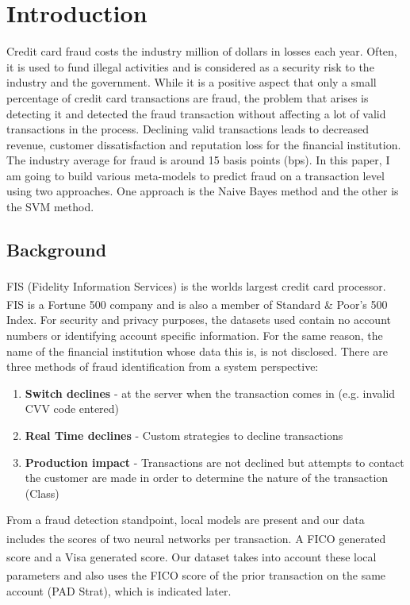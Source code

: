 \documentclass[conference]{IEEEtran}
\begin{document}
\section{Introduction}
Credit card fraud costs the industry million of dollars in losses each year. Often, it is used to fund illegal activities and is considered as a security risk to the industry and the government. While it is a positive aspect that only a small percentage of credit card transactions are fraud, the problem that arises is detecting it and detected the fraud transaction without affecting a lot of valid transactions in the process. Declining valid transactions leads to decreased revenue, customer dissatisfaction and reputation loss for the financial institution. The industry average for fraud is around 15 basis points (bps). In this paper, I am going to build various meta-models to predict fraud on a transaction level using two approaches. One approach is the Naive Bayes method and the other is the SVM method. 

\subsection{Background}

FIS\textsuperscript{\textregistered} (Fidelity Information Services) is the worlds largest credit card processor. FIS\textsuperscript{\textregistered} is a Fortune 500 company and is also a member of Standard \& Poor’s 500\textsuperscript{\textregistered} Index. For security and privacy purposes, the datasets used contain no account numbers or identifying account specific information. For the same reason, the name of the financial institution whose data this is, is not disclosed. There are three methods of fraud identification from a system perspective:

\begin{enumerate}
\item \textbf{Switch declines} - at the server when the transaction comes in (e.g. invalid CVV code entered)
\item \textbf{Real Time declines} - Custom strategies to decline transactions
\item \textbf{Production impact} - Transactions are not declined but attempts to contact the customer are made in order to determine the nature of the transaction (Class)
\end{enumerate}


From a fraud detection standpoint, local models are present and our data includes the scores of two neural networks per transaction. A FICO\textsuperscript{\textregistered} generated score and a Visa\textsuperscript{\textregistered} generated score. Our dataset takes into account these local parameters and also uses the FICO\textsuperscript{\textregistered} score of the prior transaction on the same account (PAD Strat), which is indicated later.
\end{document}
